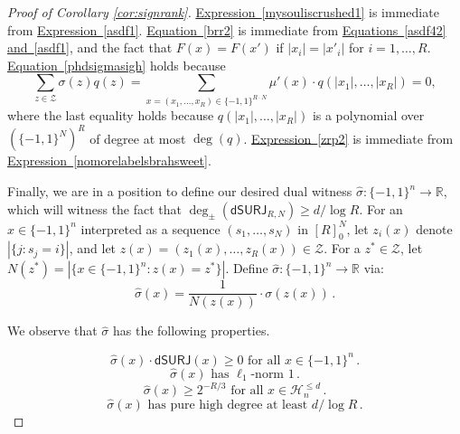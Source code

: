 \documentclass[11pt]{article}
\numberwithin{equation}{section}
\theoremstyle{definition}
\theoremstyle{plain}
\newcommand{\R}{\mathbb R}
\newcommand{\expeqref}[2]{\hyperref[#2]{#1~\eqref{#2}}}
\newcommand{\dumSURJ}{\mathsf{dSURJ}}
\newcommand{\bits}{\{-1,1\}}
\begin{document}
\begin{proof}[Proof of Corollary \ref{cor:signrank}]
\expeqref{Expression}{mysouliscrushed1} is immediate from \expeqref{Expression}{asdf1}. 
\expeqref{Equation}{brr2} is immediate from \expeqref{Equations}{asdf42} \expeqref{and}{asdf1}, and the fact that $F(x)=F(x')$ if $|x_i|=|x'_i|$ for $i=1, \dots, R$. 
\expeqref{Equation}{phdsigmasigh} holds because
$$\sum_{z \in \mathcal{Z}} \sigma(z) q(z) = \sum_{x=(x_1, \dots, x_R) \in \bits^{R \cdot N}} \mu'(x) \cdot q(|x_1|, \dots, |x_R|)
= 0,$$ 
where the last equality holds because $q(|x_1|, \dots, |x_R|)$ is a polynomial over $\left(\bits^{N}\right)^R$ of degree at most $\deg(q)$. 
\expeqref{Expression}{zrp2} is immediate from \expeqref{Expression}{nomorelabelsbrahsweet}. 

Finally, we are in a position to define our desired
dual witness $\hat{\sigma} \colon \bits^n \to \R$,
which will witness the fact that $\deg_{\pm}(\dumSURJ_{R, N}) \geq d/\log R$. 
For an $x \in \bits^n$ interpreted as a sequence $(s_1, \dots, s_N)$ in $[R]_0^N$, let $z_i(x)$ denote $\left| \{j \colon s_j=i\}\right|$,
and let $z(x)=(z_1(x), \dots, z_R(x)) \in \mathcal{Z}$. For a $z^* \in \mathcal{Z}$, let $N(z^*) = |\{x \in \bits^n \colon z(x)=z^*\}|$. 
Define $\hat{\sigma} \colon \bits^n \to \mathbb{R}$ via: 
%
\begin{equation} \label{hatsigmadef} \hat{\sigma}(x) = \frac{1}{N(z(x))} \cdot \sigma(z(x))\,.\end{equation}

%
We observe that $\hat{\sigma}$ has the following properties. %

\begin{equation} \label{mysouliscrushedhat}
\hat{\sigma}(x) \cdot \dumSURJ(x) \geq 0 \text{ for all } x \in \bits^n\,.
\end{equation}
\begin{equation} \label{brrr}
\hat{\sigma}(x) \text{ has } \ell_1\text{-norm } 1\,.
\end{equation}
\begin{equation} \label{zrp}
\hat{\sigma}(x) \geq 2^{-R/3} \text{ for all } x \in \mathcal{H}^{\leq d}_{n}\,.
\end{equation}
\begin{equation} \label{phdsigmasighhat}
\hat{\sigma}(x) \text{ has pure high degree at least } d/\log R\,.
\end{equation}


\end{proof}
\end{document}
